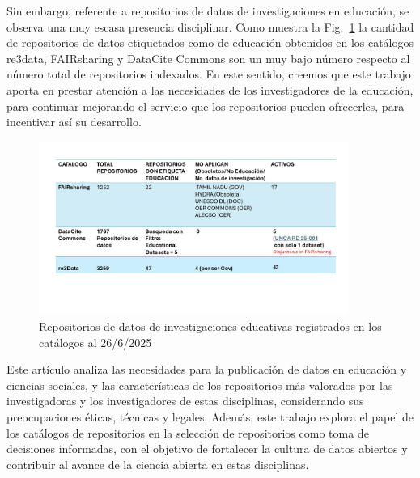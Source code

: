 \documentclass[runningheads]{llncs}
\def \bchgon {\begin{color}{blue}}
\def \echgon {\end{color}}
\begin{document}
Sin embargo, referente a repositorios de datos de investigaciones en educación, se observa una muy  escasa presencia disciplinar. Como muestra la Fig.~\ref{catalogos} la cantidad de repositorios de datos etiquetados como de educación obtenidos en  los catálogos re3data, FAIRsharing y DataCite Commons son un muy bajo número respecto al número total de repositorios indexados.
En este sentido, creemos que este trabajo aporta en prestar atención a las necesidades de los investigadores de la educación, para continuar mejorando el servicio que los repositorios pueden ofrecerles, para incentivar así su desarrollo.



\begin{figure}[h]
\includegraphics[width=0.9\textwidth]{catalogos.jpg}
\caption{Repositorios de datos de investigaciones educativas registrados en los catálogos al 26/6/2025} \label{catalogos}
\end{figure}

Este artículo analiza las necesidades para la publicación de datos en educación y ciencias sociales, y las características  de los repositorios más valorados por las investigadoras y los investigadores de estas disciplinas, considerando sus preocupaciones éticas, técnicas y legales. Además, este trabajo explora el papel de los catálogos de repositorios en la selección de repositorios como toma de decisiones informadas, con el objetivo de fortalecer la cultura de datos abiertos y contribuir al avance de la ciencia abierta en estas disciplinas.\\
\end{document}
